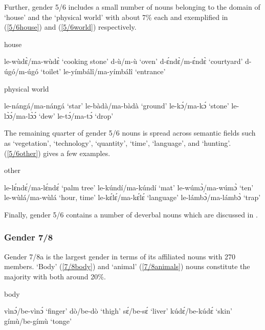 \noindent Further, gender 5/6 includes a small number of nouns belonging to the domain of `house' and the `physical world' with about 7\% each and exemplified in (\ref{5/6house}) and (\ref{5/6world}) respectively.

\begin{exe}
\ex\label{5/6house} house
\begin{xlist}
\ex le-wùdɛ̀/ma-wùdɛ̀ `cooking stone'
\ex d-ù/m-ù `oven'
\ex d-ɛ́ndɛ̀/m-ɛ́ndɛ̀ `courtyard'
\ex d-úgó/m-úgó `toilet'
\ex le-yímbálî/ma-yímbálî `entrance' 
\end{xlist}
\end{exe}

\begin{exe}
\ex\label{5/6world} physical world
\begin{xlist}
\ex le-nángá/ma-nángá `star'
\ex le-bàdà/ma-bàdà `ground'
\ex le-kɔ́/ma-kɔ́ `stone'
\ex le-lɔ̀ɔ́/ma-lɔ̀ɔ́ `dew'
\ex le-tɔ́/ma-tɔ́ `drop'
\end{xlist}
\end{exe}

\noindent The remaining quarter of gender 5/6 nouns is spread across semantic fields such as `vegetation', `technology', `quantity', `time', `language', and `hunting'. (\ref{5/6other}) gives a few examples.

\begin{exe}
\ex\label{5/6other} other
\begin{xlist}
\ex le-lɛ́ndɛ́/ma-lɛ́ndɛ́ `palm tree'
\ex le-kúndí/ma-kúndí `mat'
\ex le-wúmɔ̀/ma-wúmɔ̀ `ten'
\ex le-wùlá/ma-wùlá `hour, time'
\ex le-kɛ́lɛ́/ma-kɛ́lɛ́ `language'
\ex le-lámbɔ̀/ma-lámbɔ̀ `trap'
\end{xlist}
\end{exe}

\noindent Finally, gender 5/6 contains a number of deverbal nouns which are discussed in .


\subsubsection{Gender 7/8}
\label{sec:7/8}

Gender 7/8a is the largest gender in terms of its affiliated nouns with 270 members. `Body' (\ref{7/8body}) and `animal' (\ref{7/8animals}) nouns constitute the majority with both around 20\%. 

\begin{exe}
\ex\label{7/8body} body
\begin{xlist}
\ex vìnɔ́/be-vìnɔ́ `finger'
\ex dò/be-dò `thigh'
\ex sɛ́/be-sɛ́ `liver'
\ex kúdɛ́/be-kúdɛ́ `skin'
\ex gímù/be-gímù `tonge'
\end{xlist}
\end{exe}

